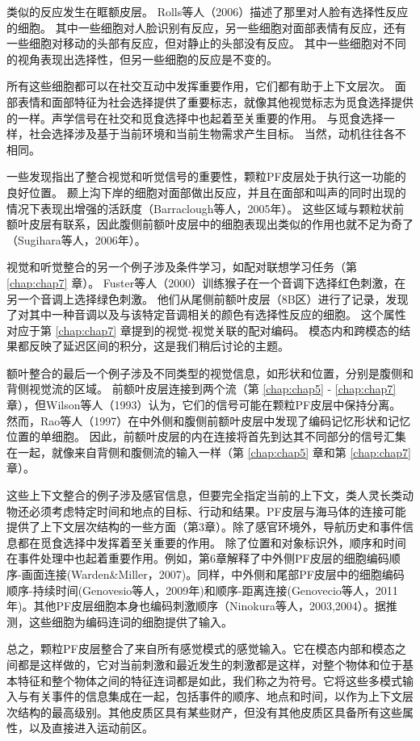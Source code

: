 类似的反应发生在眶额皮层。
Rolls等人（2006）描述了那里对人脸有选择性反应的细胞。
其中一些细胞对人脸识别有反应，另一些细胞对面部表情有反应，还有一些细胞对移动的头部有反应，但对静止的头部没有反应。
其中一些细胞对不同的视角表现出选择性，但另一些细胞的反应是不变的。
\par


所有这些细胞都可以在社交互动中发挥重要作用，它们都有助于上下文层次。
面部表情和面部特征为社会选择提供了重要标志，就像其他视觉标志为觅食选择提供的一样。声学信号在社交和觅食选择中也起着至关重要的作用。
与觅食选择一样，社会选择涉及基于当前环境和当前生物需求产生目标。
当然，动机往往各不相同。
\par


一些发现指出了整合视觉和听觉信号的重要性，颗粒PF皮层处于执行这一功能的良好位置。
颞上沟下岸的细胞对面部做出反应，并且在面部和叫声的同时出现的情况下表现出增强的活跃度（Barraclough等人，2005年）。
这些区域与颗粒状前额叶皮层有联系，因此腹侧前额叶皮层中的细胞表现出类似的作用也就不足为奇了（Sugihara等人，2006年）。
\par


视觉和听觉整合的另一个例子涉及条件学习，如配对联想学习任务（第 \ref{chap:chap7} 章）。
Fuster等人（2000）训练猴子在一个音调下选择红色刺激，在另一个音调上选择绿色刺激。
他们从尾侧前额叶皮层（8B区）进行了记录，发现了对其中一种音调以及与该特定音调相关的颜色有选择性反应的细胞。
这个属性对应于第 \ref{chap:chap7} 章提到的视觉-视觉关联的配对编码。
模态内和跨模态的结果都反映了延迟区间的积分，这是我们稍后讨论的主题。
\par


额叶整合的最后一个例子涉及不同类型的视觉信息，如形状和位置，分别是腹侧和背侧视觉流的区域。
前额叶皮层连接到两个流（第 \ref{chap:chap5} - \ref{chap:chap7} 章），但Wilson等人（1993）认为，它们的信号可能在颗粒PF皮层中保持分离。
然而，Rao等人（1997）在中外侧和腹侧前额叶皮层中发现了编码记忆形状和记忆位置的单细胞。
因此，前额叶皮层的内在连接将首先到达其不同部分的信号汇集在一起，就像来自背侧和腹侧流的输入一样（第 \ref{chap:chap5} 章和第 \ref{chap:chap7} 章）。
\par

这些上下文整合的例子涉及感官信息，但要完全指定当前的上下文，类人灵长类动物还必须考虑特定时间和地点的目标、行动和结果。PF皮层与海马体的连接可能提供了上下文层次结构的一些方面（第3章）。除了感官环境外，导航历史和事件信息都在觅食选择中发挥着至关重要的作用。
除了位置和对象标识外，顺序和时间在事件处理中也起着重要作用。例如，第6章解释了中外侧PF皮层的细胞编码顺序-画面连接(Warden\&Miller，2007)。同样，中外侧和尾部PF皮层中的细胞编码顺序-持续时间(Genovesio等人，2009年)和顺序-距离连接(Genovecio等人，2011年)。其他PF皮层细胞本身也编码刺激顺序（Ninokura等人，2003,2004）。据推测，这些细胞为编码连词的细胞提供了输入。
\par
总之，颗粒PF皮层整合了来自所有感觉模式的感觉输入。它在模态内部和模态之间都是这样做的，它对当前刺激和最近发生的刺激都是这样，对整个物体和位于基本特征和整个物体之间的特征连词都是如此，我们称之为符号。它将这些多模式输入与有关事件的信息集成在一起，包括事件的顺序、地点和时间，以作为上下文层次结构的最高级别。其他皮质区具有某些财产，但没有其他皮质区具备所有这些属性，以及直接进入运动前区。

